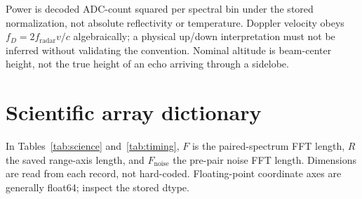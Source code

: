 \documentclass[11pt]{article}
\begin{document}
Power is decoded ADC-count squared per spectral bin under the stored
normalization, not absolute reflectivity or temperature. Doppler velocity obeys
$f_D=2f_\mathrm{radar}v/c$ algebraically; a physical up/down interpretation must
not be inferred without validating the convention. Nominal altitude is
beam-center height, not the true height of an echo arriving through a sidelobe.

\clearpage
\section{Scientific array dictionary}

In Tables~\ref{tab:science} and~\ref{tab:timing}, $F$ is the paired-spectrum FFT
length, $R$ the saved range-axis length, and $F_\mathrm{noise}$ the pre-pair
noise FFT length. Dimensions are read from each record, not hard-coded.
Floating-point coordinate axes are generally float64; inspect the stored dtype.
\end{document}
